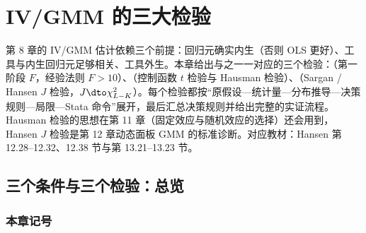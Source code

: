 \chapter{IV/GMM 的三大检验}\label{ch:U09-tests}

第 8 章的 IV/GMM 估计依赖三个前提：回归元确实内生（否则 OLS 更好）、工具与内生回归元足够相关、工具外生。本章给出与之一一对应的三个检验：（第一阶段 $F$，经验法则 $F>10$）、（控制函数 $t$ 检验与 Hausman 检验）、（Sargan / Hansen $J$ 检验，$J\dto\chi^2_{L-K}$）。每个检验都按“原假设—统计量—分布推导—决策规则—局限—Stata 命令”展开，最后汇总决策规则并给出完整的实证流程。Hausman 检验的思想在第 11 章（固定效应与随机效应的选择）还会用到，Hansen $J$ 检验是第 12 章动态面板 GMM 的标准诊断。对应教材：Hansen 第 12.28--12.32、12.38 节与第 13.21--13.23 节。

\section{三个条件与三个检验：总览}\label{sec:U09-overview}

\subsection{本章记号}

